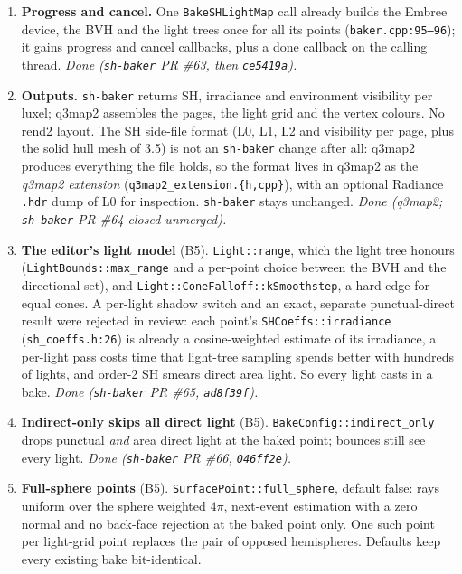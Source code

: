 \documentclass[11pt,a4paper]{article}
\begin{document}
\begin{enumerate}
  their cut-outs. Kept out of item~1 because it changes bake output; needed by 4.3.
  \emph{Done (\texttt{sh-baker} PR \#62).}
\item \textbf{Progress and cancel.} One \texttt{BakeSHLightMap} call already builds the Embree
  device, the BVH and the light trees once for all its points (\texttt{baker.cpp:95--96}); it
  gains progress and cancel callbacks, plus a done callback on the calling thread.
  \emph{Done (\texttt{sh-baker} PR \#63, then \texttt{ce5419a}).}
\item \textbf{Outputs.} \texttt{sh-baker} returns SH, irradiance and environment visibility per
  luxel; q3map2 assembles the pages, the light grid and the vertex colours. No rend2 layout. The
  SH side-file format (L0, L1, L2 and visibility per page, plus the solid hull mesh of 3.5) is not
  an \texttt{sh-baker} change after all: q3map2 produces everything the file holds, so the format
  lives in q3map2 as the \emph{q3map2 extension} (\texttt{q3map2\_extension.\{h,cpp\}}), with an
  optional Radiance \texttt{.hdr} dump of L0 for inspection. \texttt{sh-baker} stays unchanged.
  \emph{Done (q3map2; \texttt{sh-baker} PR \#64 closed unmerged).}
\item \textbf{The editor's light model} (B5). \texttt{Light::range}, which the light tree honours
  (\texttt{LightBounds::max\_range} and a per-point choice between the BVH and the directional
  set), and \texttt{Light::ConeFalloff::kSmoothstep}, a hard edge for equal cones. A per-light
  shadow switch and an exact, separate punctual-direct result were rejected in review: each point's
  \texttt{SHCoeffs::irradiance} (\texttt{sh\_coeffs.h:26}) is already a cosine-weighted estimate of
  its irradiance, a per-light pass costs time that light-tree sampling spends better with hundreds
  of lights, and order-2 SH smears direct area light. So every light casts in a bake.
  \emph{Done (\texttt{sh-baker} PR \#65, \texttt{ad8f39f}).}
\item \textbf{Indirect-only skips all direct light} (B5). \texttt{BakeConfig::indirect\_only} drops
  punctual \emph{and} area direct light at the baked point; bounces still see every light.
  \emph{Done (\texttt{sh-baker} PR \#66, \texttt{046ff2e}).}
\item \textbf{Full-sphere points} (B5). \texttt{SurfacePoint::full\_sphere}, default false: rays
  uniform over the sphere weighted $4\pi$, next-event estimation with a zero normal and no
  back-face rejection at the baked point only. One such point per light-grid point replaces the
  pair of opposed hemispheres. Defaults keep every existing bake bit-identical.

\end{enumerate}
\end{document}

